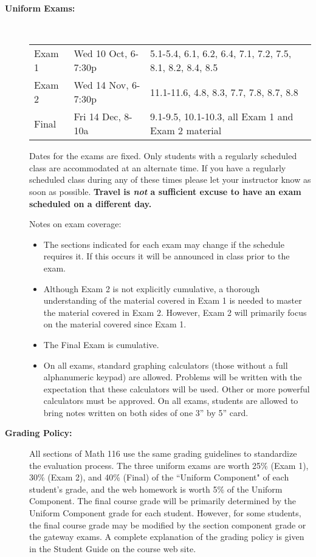 \documentclass[11pt,twoside]{article}
\begin{document}
\begin{description}
\vspace{.1in}
\item[\bf Uniform Exams:]\mbox{\ }

\begin{tabular}{lll}
Exam 1 &  Wed 10 Oct, 6-7:30p & 5.1-5.4, 6.1, 6.2, 6.4, 7.1, 7.2, 7.5, 8.1, 8.2, 8.4, 8.5 \\
Exam 2 & Wed 14 Nov, 6-7:30p & 11.1-11.6, 4.8, 8.3, 7.7, 7.8, 8.7, 8.8 \\
Final &  Fri 14 Dec, 8-10a & 9.1-9.5, 10.1-10.3, all Exam 1 and Exam 2 material
\end{tabular}

Dates for the exams are fixed.  Only students with a regularly scheduled class are accommodated at an alternate time.  If you have a regularly scheduled class during any of these times please let your instructor know as soon as possible.  \textbf{Travel is \emph{not} a sufficient excuse to have an exam scheduled on a different day.}

Notes on exam coverage:
\begin{itemize}
\item The sections indicated for each exam may change if the schedule requires it. If this
occurs it will be announced in class prior to the exam.
\item Although Exam 2 is not explicitly cumulative, a thorough understanding of the material
covered in Exam 1 is needed to master the material covered in Exam 2. However,
Exam 2 will primarily focus on the material covered since Exam 1.
\item The Final Exam is cumulative.
\item On all exams, standard graphing calculators (those without a full alphanumeric
keypad) are allowed. Problems will be written with the expectation that these
calculators will be used. Other or more powerful calculators must be approved. On all
exams, students are allowed to bring notes written on both sides of one 3'' by 5'' card.
\end{itemize}

\vspace{.1in}
\item[\bf Grading Policy:]  All sections of Math 116 use the same grading guidelines to standardize the evaluation process.  The three uniform exams are worth 25\% (Exam 1), 30\% (Exam 2), and 40\% (Final) of the ``Uniform Component" of each student's grade, and the
web homework is worth 5\% of the Uniform Component. The final course grade will be
primarily determined by the Uniform Component grade for each student. However, for some
students, the final course grade may be modified by the section component grade or the
gateway exams.  A complete explanation of the grading policy is given in the Student Guide on the course web site. 


\end{description}
\end{document}
